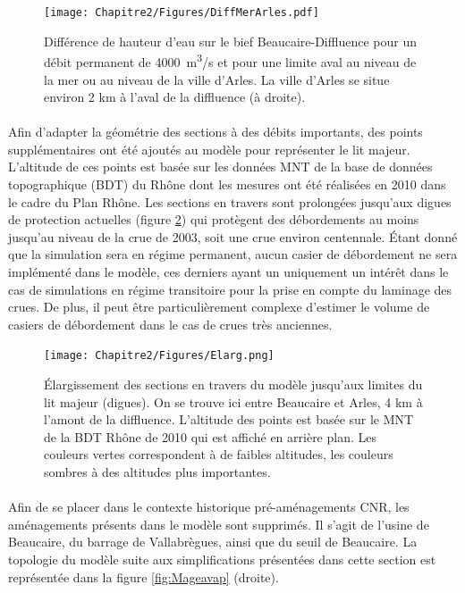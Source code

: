 	\begin{figure}[h]
	\centering
		\texttt{[image: Chapitre2/Figures/DiffMerArles.pdf]}
        \caption{Différence de hauteur d'eau sur le bief Beaucaire-Diffluence pour un débit permanent de 4000~m\textsuperscript{3}/s et pour une limite aval au niveau de la mer ou au niveau de la ville d'Arles. La ville d'Arles se situe environ 2 km à l'aval de la diffluence (à droite).}
		\label{fig:DifMerArles}
	\end{figure}			 
	 	
\FloatBarrier

	\paragraph{} Afin d'adapter la géométrie des sections à des débits importants, des points supplémentaires ont été ajoutés au modèle pour représenter le lit majeur. L'altitude de ces points est basée sur les données MNT de la base de données topographique (BDT) du Rhône dont les mesures ont été réalisées en 2010 dans le cadre du Plan Rhône. Les sections en travers sont prolongées jusqu'aux digues de protection actuelles (figure \ref{fig:Elarg}) qui protègent des débordements au moins jusqu'au niveau de la crue de 2003, soit une crue environ centennale. Étant donné que la simulation sera en régime permanent, aucun casier de débordement ne sera implémenté dans le modèle, ces derniers ayant un uniquement un intérêt dans le cas de simulations en régime transitoire pour la prise en compte du laminage des crues. De plus, il peut être particulièrement complexe d'estimer le volume de casiers de débordement dans le cas de crues très anciennes.
	
	\begin{figure}[h]
	\centering
		\texttt{[image: Chapitre2/Figures/Elarg.png]}
        \caption{Élargissement des sections en travers du modèle jusqu'aux limites du lit majeur (digues). On se trouve ici entre Beaucaire et Arles, 4 km à l'amont de la diffluence. L'altitude des points est basée sur le MNT de la BDT Rhône de 2010 qui est affiché en arrière plan. Les couleurs vertes correspondent à de faibles altitudes, les couleurs sombres à des altitudes plus importantes.}
		\label{fig:Elarg}
	\end{figure}		
	
	\paragraph{} Afin de se placer dans le contexte historique pré-aménagements CNR, les aménagements présents dans le modèle sont supprimés. Il s'agit de l'usine de Beaucaire, du barrage de Vallabrègues, ainsi que du seuil de Beaucaire. La topologie du modèle suite aux simplifications présentées dans cette section est représentée dans la figure \ref{fig:Mageavap} (droite).
	
